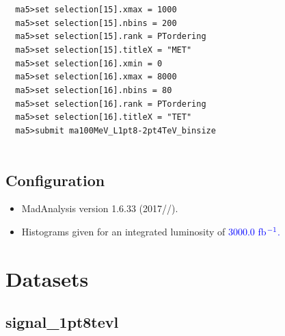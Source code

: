 \documentclass[a4paper, 10pt]{article}
\begin{document}
\texttt{ }\texttt{ }\texttt{ma5>set selection[15].xmax = 1000\\
}
\texttt{ }\texttt{ }\texttt{ma5>set selection[15].nbins = 200\\
}
\texttt{ }\texttt{ }\texttt{ma5>set selection[15].rank = PTordering\\
}
\texttt{ }\texttt{ }\texttt{ma5>set selection[15].titleX = "MET"\\
}
\texttt{ }\texttt{ }\texttt{ma5>set selection[16].xmin = 0\\
}
\texttt{ }\texttt{ }\texttt{ma5>set selection[16].xmax = 8000\\
}
\texttt{ }\texttt{ }\texttt{ma5>set selection[16].nbins = 80\\
}
\texttt{ }\texttt{ }\texttt{ma5>set selection[16].rank = PTordering\\
}
\texttt{ }\texttt{ }\texttt{ma5>set selection[16].titleX = "TET"\\
}
\texttt{ }\texttt{ }\texttt{ma5>submit ma100MeV\_L1pt8-2pt4TeV\_binsize\\
}
\texttt{ }\texttt{ }\subsection{ Configuration}

\begin{itemize}
  \item MadAnalysis version 1.6.33 (2017//).
   \item Histograms given for an integrated luminosity of \textcolor{blue}{3000.0}\textcolor{blue}{ fb}$^{\textcolor{blue}{-1}}$\textcolor{blue}{.}
\textcolor{blue}{}
\end{itemize}
\newpage
\section{ Datasets}

\subsection{ signal\_1pt8tevl}
\end{document}
